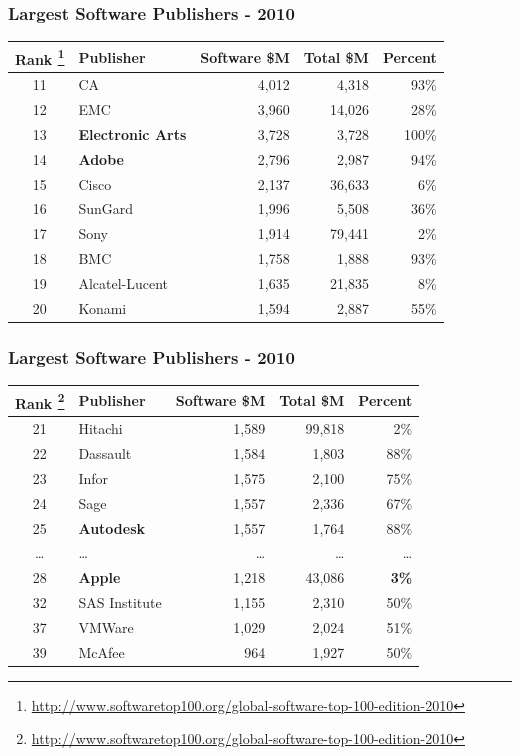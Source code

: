 \documentclass[18pt]{beamer}
\begin{document}
{
\begin{frame}
\frametitle{Largest Software Publishers - 2010}

\begin{center}
\begin{tabular}{clrrr}
\hline
\textbf{Rank
\footnote{
\url{http://www.softwaretop100.org/global-software-top-100-edition-2010}}
} &\textbf{Publisher} &	\textbf{Software \$M} & \textbf{Total \$M} & \textbf{Percent} \\
\hline
\hline
11 & CA & 4,012  & 4,318 & 93\% \\
12 & EMC & 3,960  & 14,026 & 28\% \\
13 & \textbf{Electronic Arts} & 3,728  &  3,728 & 100\% \\
14 & \textbf{Adobe} & 2,796 &  2,987 & 94\% \\
15 & Cisco & 2,137 & 36,633 & 6\% \\
16 & SunGard & 1,996  & 5,508 & 36\% \\
17 & Sony & 1,914 &  79,441 & 2\% \\
18 & BMC & 1,758& 1,888 & 93\% \\
19 & Alcatel-Lucent & 1,635  &  21,835 & 8\% \\
20 & Konami & 1,594 &  2,887 & 55\% \\
\end{tabular}

\end{center}
\end{frame}
}


{
\begin{frame}
\frametitle{Largest Software Publishers - 2010}

\begin{center}
\begin{tabular}{clrrr}
\hline
\textbf{Rank
\footnote{
\url{http://www.softwaretop100.org/global-software-top-100-edition-2010}}
} &\textbf{Publisher} &	\textbf{Software \$M} & \textbf{Total \$M} & \textbf{Percent} \\
\hline
\hline
21 & Hitachi & 1,589 & 99,818 & 2\% \\
22 & Dassault & 1,584 & 1,803 & 88\% \\
23 & Infor & 1,575 & 2,100 & 75\% \\
24 & Sage & 1,557 & 2,336 & 67\% \\
25 & \textbf{Autodesk} & 1,557 & 1,764 & 88\% \\
\ldots & \ldots & \ldots & \ldots & \ldots \\
28 & \textbf{Apple} & 1,218 &	43,086 & 	\textbf{3\%}  \\
32 & SAS Institute & 1,155 	& 	2,310 &	50\%  \\
37 & VMWare & 1,029 &	2,024 & 	51\%  \\
39 & McAfee & 964 &	1,927 & 50\% \\
\end{tabular}

\end{center}
\end{frame}
}
\end{document}
